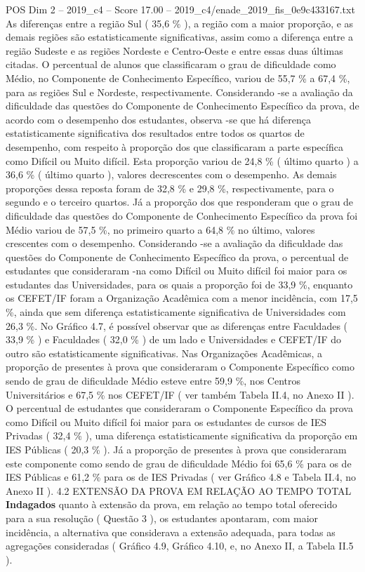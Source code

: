 \begin{textsample}{POS Dim 2 – 2019\_c4 – Score 17.00 – 2019\_c4/enade\_2019\_fis\_0e9c433167.txt}
As diferenças entre a região Sul ( 35,6 \% ), a região com a maior proporção, e as demais regiões são estatisticamente significativas, assim como a diferença entre a região Sudeste e as regiões Nordeste e Centro-Oeste e entre essas duas últimas citadas.
O percentual de alunos que classificaram o grau de dificuldade como Médio, no Componente de Conhecimento Específico, variou de 55,7 \% a 67,4 \%, para as regiões Sul e Nordeste, respectivamente.
Considerando -se a avaliação da dificuldade das questões do Componente de Conhecimento Específico da prova, de acordo com o desempenho dos estudantes, observa -se que há diferença estatisticamente significativa dos resultados entre todos os quartos de desempenho, com respeito à proporção dos que classificaram a parte específica como Difícil ou Muito difícil.
Esta proporção variou de 24,8 \% ( último quarto ) a 36,6 \% ( último quarto ), valores decrescentes com o desempenho.
As demais proporções dessa reposta foram de 32,8 \% e 29,8 \%, respectivamente, para o segundo e o terceiro quartos.
Já a proporção dos que responderam que o grau de dificuldade das questões do Componente de Conhecimento Específico da prova foi Médio variou de 57,5 \%, no primeiro quarto a 64,8 \% no último, valores crescentes com o desempenho.
Considerando -se a avaliação da dificuldade das questões do Componente de Conhecimento Específico da prova, o percentual de estudantes que consideraram -na como Difícil ou Muito difícil foi maior para os estudantes das Universidades, para os quais a proporção foi de 33,9 \%, enquanto os CEFET/IF foram a Organização Acadêmica com a menor incidência, com 17,5 \%, ainda que sem diferença estatisticamente significativa de Universidades com 26,3 \%.
No Gráfico 4.7, é possível observar que as diferenças entre Faculdades ( 33,9 \% ) e Faculdades ( 32,0 \% ) de um lado e Universidades e CEFET/IF do outro são estatisticamente significativas.
Nas Organizações Acadêmicas, a proporção de presentes à prova que consideraram o Componente Específico como sendo de grau de dificuldade Médio esteve entre 59,9 \%, nos Centros Universitários e 67,5 \% nos CEFET/IF ( ver também Tabela II.4, no Anexo II ).
O percentual de estudantes que consideraram o Componente Específico da prova como Difícil ou Muito difícil foi maior para os estudantes de cursos de IES Privadas ( 32,4 \% ), uma diferença estatisticamente significativa da proporção em IES Públicas ( 20,3 \% ).
Já a proporção de presentes à prova que consideraram este componente como sendo de grau de dificuldade Médio foi 65,6 \% para os de IES Públicas e 61,2 \% para os de IES Privadas ( ver Gráfico 4.8 e Tabela II.4, no Anexo II ). 4.2 EXTENSÃO DA PROVA EM RELAÇÃO AO TEMPO TOTAL \textbf{Indagados} quanto à extensão da prova, em relação ao tempo total oferecido para a sua resolução ( Questão 3 ), os estudantes apontaram, com maior incidência, a alternativa que considerava a extensão adequada, para todas as agregações consideradas ( Gráfico 4.9, Gráfico 4.10, e, no Anexo II, a Tabela II.5 ).

\end{textsample}
